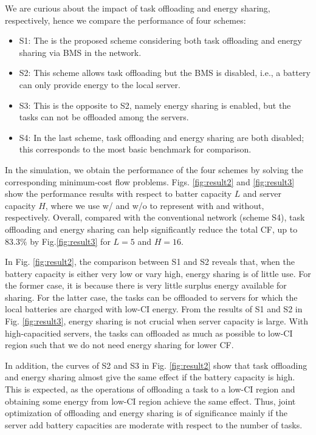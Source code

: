 \documentclass[conference, 10pt, ﬁnal, letterpaper, twocolumn]{IEEEtran}
\begin{document}
We are curious about the impact of task offloading and energy sharing, respectively, hence we compare the performance of four schemes:
\begin{itemize}
    \item S1: The is the proposed scheme considering both task offloading and energy sharing via BMS in the network.
    \item S2: This scheme allows task offloading but the BMS is disabled, i.e., a battery can only provide energy to the local server.
    \item S3: This is the opposite to S2, namely energy sharing is enabled, but the tasks can not be offloaded among the servers.
    \item S4: In the last scheme, task offloading and energy sharing are both disabled; this corresponds to the most basic benchmark for comparison.
\end{itemize}
In the simulation, we obtain the performance of the four schemes by solving the corresponding minimum-cost flow problems. Figs. \ref{fig:result2} and \ref{fig:result3} show the performance results with respect to batter capacity $L$ and server capacity $H$, where we use w/ and w/o to represent with and without, respectively. Overall, compared with the conventional network (scheme S4), task offloading and energy sharing can help significantly reduce the total CF, up to $83.3\%$ by Fig.\ref{fig:result3} for $L = 5$ and $H = 16$.





In Fig. \ref{fig:result2}, the comparison between S1 and S2 reveals that, when the battery capacity is either very low or vary high, energy sharing is of little use. For the former case, it is because there is very little surplus energy available for sharing. For the latter case, the tasks can be offloaded to servers for which the local batteries are charged with low-CI energy. From the results of S1 and S2 in Fig. \ref{fig:result3}, energy sharing is not crucial when server capacity is large. With high-capacitied servers, the tasks can offloaded as much as possible to low-CI region such that we do not need energy sharing for lower CF. 

In addition, the curves of S2 and S3 in Fig. \ref{fig:result2} show that task offloading and energy sharing almost give the same effect if the battery capacity is high. This is expected, as the operations of offloading a task to a low-CI region and obtaining some energy from low-CI region achieve the same effect. Thus, joint optimization of offloading and energy sharing is of significance mainly if the server add battery capacities are moderate with respect to the number of tasks.
\end{document}

